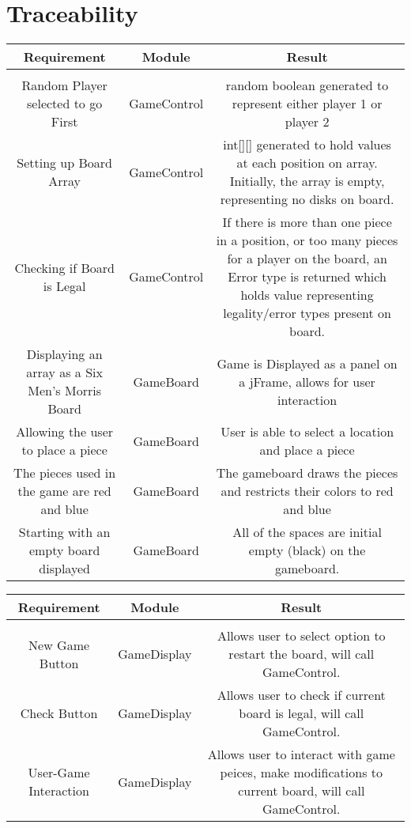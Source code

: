 \documentclass[12pt]{article}
\begin{document}
	\section{Traceability}
	\begin{tabularx}{\linewidth}{|C|C|C|}
		Requirement & Module & Result \\
		\hline \\
		Random Player selected to go First & GameControl & random boolean generated to represent either player 1 or player 2 \\
		Setting up Board Array & GameControl & int[][] generated to hold values at each position on array. Initially, the array is empty, representing no disks on board. \\
		Checking if Board is Legal & GameControl & If there is more than one piece in a position, or too many pieces for a player on the board, an Error type is returned which holds value representing legality/error types present on board. \\
		Displaying an array as a Six Men's Morris Board &
		GameBoard & Game is Displayed as a panel on a jFrame, allows for user interaction \\ 
		Allowing the user to place a piece & GameBoard &
		User is able to select a location and place a piece \\
		The pieces used in the game are red and blue & GameBoard & The gameboard draws the pieces and restricts their colors to red and blue \\
		Starting with an empty board displayed & GameBoard & All of the spaces are initial empty (black) on the gameboard. \\
	\end{tabularx}
		\begin{tabularx}{\linewidth}{|C|C|C|}
			Requirement & Module & Result \\
			\hline \\
			
			New Game Button & GameDisplay & Allows user to select option to restart the board, will call GameControl. \\
			Check Button & GameDisplay  & Allows user to check if current board is legal, will call GameControl. \\
			User-Game Interaction & GameDisplay &Allows user to interact with game peices, make modifications to current board, will call GameControl. \\
	\end{tabularx}
	
\end{document}
